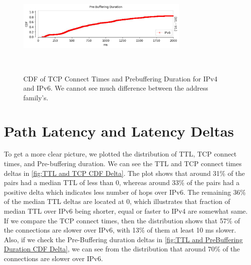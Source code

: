 \begin{figure}
\begin{minipage}{0.5\textwidth}
	\end{minipage}
	\begin{minipage}{0.5\textwidth}
		\centering
		\includegraphics[keepaspectratio, height=5cm, width=8.5cm]{figures/tcp/netflix-prebuffering-duration-absolute-difference-v6.pdf}
	\end{minipage}
	\caption[Connect Time and Prebuffering Duration CDF Absolute]{CDF of TCP Connect Times and Prebuffering Duration for IPv4 and IPv6. We cannot see much difference between the address family's.}
	\label{fig:Connect Time and Prebuffering Duration CDF Absolute}
\end{figure}

\FloatBarrier

\section{Path Latency and Latency Deltas}

To get a more clear picture, we plotted the distribution of TTL, TCP connect times, and Pre-buffering duration. We can see the TTL and TCP connect times deltas in \cref{fig:TTL and TCP CDF Delta}. 
The plot shows that around 31\% of the pairs had a median TTL of less than 0, whereas around 33\% of the pairs had a positive delta which indicates less number of hops over IPv6. 
The remaining 36\% of the median TTL deltas are located at 0, which illustrates that fraction of median TTL over IPv6 being shorter, equal or faster to IPv4 are somewhat same. 
If we compare the TCP connect times, then the distribution shows that 57\% of the connections are slower over IPv6, with 13\% of them at least 10 ms slower.
Also, if we check the Pre-Buffering duration deltas in \cref{fig:TTL and PreBuffering Duration CDF Delta}, we can see from the distribution that around 70\% of the connections 
are slower over IPv6.

